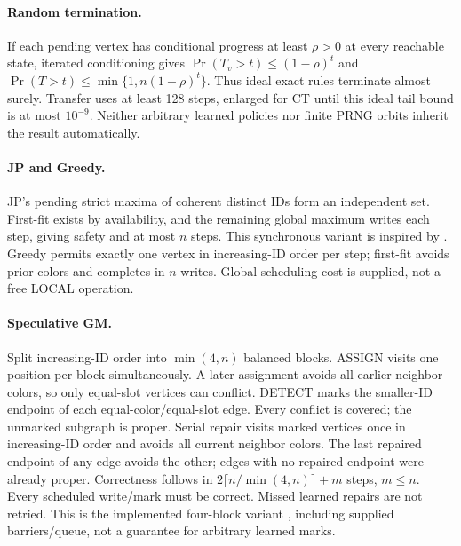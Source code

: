 \documentclass[10pt]{article}
\begin{document}
\paragraph{Random termination.}
If each pending vertex has conditional progress at least $\rho>0$ at every
reachable state, iterated conditioning gives
$\Pr(T_v>t)\le(1-\rho)^t$ and
$\Pr(T>t)\le\min\{1,n(1-\rho)^t\}$. Thus ideal exact rules terminate
almost surely. Transfer uses at least 128 steps, enlarged for CT until this
ideal tail bound is at most $10^{-9}$. Neither arbitrary learned policies
nor finite PRNG orbits inherit the result automatically.

\paragraph{JP and Greedy.}
JP's pending strict maxima of coherent distinct IDs form an independent set.
First-fit exists by availability, and the remaining global maximum writes
each step, giving safety and at most $n$ steps. This synchronous variant is
inspired by \citet{jones1993parallel}. Greedy permits exactly one vertex in
increasing-ID order per step; first-fit avoids prior colors and completes in
$n$ writes. Global scheduling cost is supplied, not a free LOCAL operation.

\paragraph{Speculative GM.}
Split increasing-ID order into $\min(4,n)$ balanced blocks. ASSIGN visits
one position per block simultaneously. A later assignment avoids all earlier
neighbor colors, so only equal-slot vertices can conflict. DETECT marks the
smaller-ID endpoint of each equal-color/equal-slot edge. Every conflict is
covered; the unmarked subgraph is proper. Serial repair visits marked vertices
once in increasing-ID order and avoids all current neighbor colors. The last
repaired endpoint of any edge avoids the other; edges with no repaired
endpoint were already proper. Correctness follows in
$2\lceil n/\min(4,n)\rceil+m$ steps, $m\le n$. Every scheduled write/mark
must be correct. Missed learned repairs are not retried. This is the
implemented four-block variant \citep{gebremedhin2000scalable}, including
supplied barriers/queue, not a guarantee for arbitrary learned marks.
\end{document}
